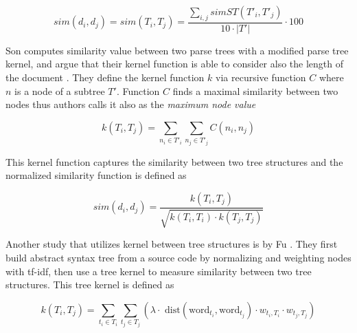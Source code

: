 \begin{equation}
    sim(d_i, d_j) = sim(T_i, T_j) = \dfrac{\sum\limits_{i, j}simST(T'_i, T'_j)}{10 \cdot |T'|} \cdot 100
\end{equation}

\noindent
Son \etal computes similarity value between two parse trees with a modified parse tree kernel, and argue that their kernel function is able to consider also the length of the document \cite{AAPSCDPTK2013}. They define the kernel function $k$ via recursive function $C$ where $n$ is a node of a subtree $T'$. Function $C$ finds a maximal similarity between two nodes thus authors calls it also as the \emph{maximum node value}  

\begin{equation}
    k(T_i, T_j) = \sum\limits_{n_i \in T'_i} \sum\limits_{n_j \in T'_j} C(n_i, n_j)
\end{equation}

\noindent
This kernel function captures the similarity between two tree structures and the normalized similarity function is defined as \cite{AAPSCDPTK2013}

\begin{equation}\label{norm_kern_eqn}
    sim(d_i, d_j) = \dfrac{k(T_i, T_j)}{\sqrt{k(T_i, T_i) \cdot k(T_j, T_j)}}
\end{equation}


\noindent
Another study that utilizes kernel between tree structures is by Fu \etal \cite{Fu2017WASTKAW}. They first build abstract syntax tree from a source code by normalizing and weighting nodes with tf-idf, then use a tree kernel to measure similarity between two tree structures. This tree kernel is defined as

\begin{equation}
    k(T_i, T_j) =  \sum\limits_{t_i \in T_i} \sum\limits_{t_j \in T_j} \left(\lambda \cdot \text{ dist}(\text{word}_{t_i}, \text{word}_{t_j}) \cdot w_{t_i, T_i} \cdot w_{t_j, T_j}\right)
\end{equation}

